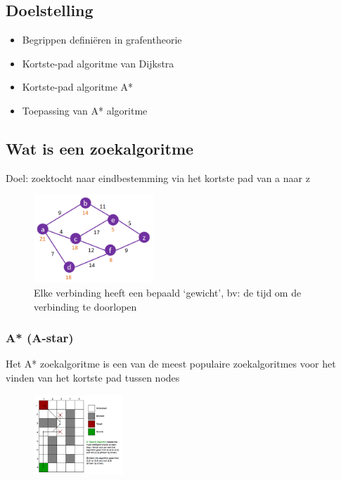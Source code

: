 \documentclass{article}
\begin{document}
\subsection{Doelstelling}

\begin{itemize}
    \item Begrippen definiëren in grafentheorie
    \item Kortste-pad algoritme van Dijkstra
    \item Kortste-pad algoritme A*
    \item Toepassing van A* algoritme
\end{itemize}

\subsection{Wat is een zoekalgoritme}

Doel: zoektocht naar eindbestemming via het kortste pad van a naar z

\begin{figure}[H]
    \centering
    \includegraphics[width=0.4\textwidth]{zoekalgoritme.png}
    \caption{Elke verbinding heeft een bepaald `gewicht', bv: de tijd om de verbinding te doorlopen}
\end{figure}

\subsubsection{A* (A-star)}

Het A* zoekalgoritme is een van de meest populaire zoekalgoritmes voor 
het vinden van het kortste pad tussen nodes

\begin{figure}[H]
    \centering
    \includegraphics[width=0.3\textwidth]{a-star.png}
\end{figure}
\end{document}

